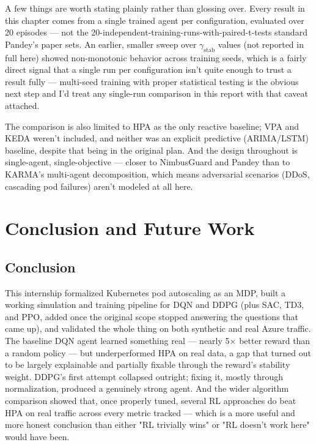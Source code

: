 \documentclass{rapportINPTCLOUD}
\begin{document}
A few things are worth stating plainly rather than glossing over. Every result in this chapter comes from a single trained agent per configuration, evaluated over 20 episodes — not the 20-independent-training-runs-with-paired-t-tests standard Pandey's paper sets. An earlier, smaller sweep over $\gamma_{\text{stab}}$ values (not reported in full here) showed non-monotonic behavior across training seeds, which is a fairly direct signal that a single run per configuration isn't quite enough to trust a result fully — multi-seed training with proper statistical testing is the obvious next step and I'd treat any single-run comparison in this report with that caveat attached.

The comparison is also limited to HPA as the only reactive baseline; VPA and KEDA weren't included, and neither was an explicit predictive (ARIMA/LSTM) baseline, despite that being in the original plan. And the design throughout is single-agent, single-objective — closer to NimbusGuard and Pandey than to KARMA's multi-agent decomposition, which means adversarial scenarios (DDoS, cascading pod failures) aren't modeled at all here.



\chapter{Conclusion and Future Work}
\label{chap:conclusion}

\section{Conclusion}

This internship formalized Kubernetes pod autoscaling as an MDP, built a working simulation and training pipeline for DQN and DDPG (plus SAC, TD3, and PPO, added once the original scope stopped answering the questions that came up), and validated the whole thing on both synthetic and real Azure traffic. The baseline DQN agent learned something real — nearly 5$\times$ better reward than a random policy — but underperformed HPA on real data, a gap that turned out to be largely explainable and partially fixable through the reward's stability weight. DDPG's first attempt collapsed outright; fixing it, mostly through normalization, produced a genuinely strong agent. And the wider algorithm comparison showed that, once properly tuned, several RL approaches do beat HPA on real traffic across every metric tracked — which is a more useful and more honest conclusion than either "RL trivially wins" or "RL doesn't work here" would have been.
\end{document}
